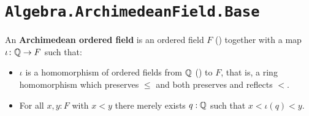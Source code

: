 \section{\texttt{Algebra.ArchimedeanField.Base}}


\begin{definition}
  \label{IsArchimedeanField}
  An \textbf{Archimedean ordered field} is an ordered field $F$ () together with a map $\iota \colon \mathbb{Q} \to F$ such that:
  \begin{itemize}
  \item $\iota$ is a homomorphism of ordered fields from $\mathbb{Q}$ () to $F$, that is, a ring homomorphism which preserves $\le$ and both preserves and reflects $<$.
  \item For all $x, y : F$ with $x < y$ there merely exists $q : \mathbb{Q}$ such that $x < \iota(q) < y$.
  \end{itemize}
\end{definition}
